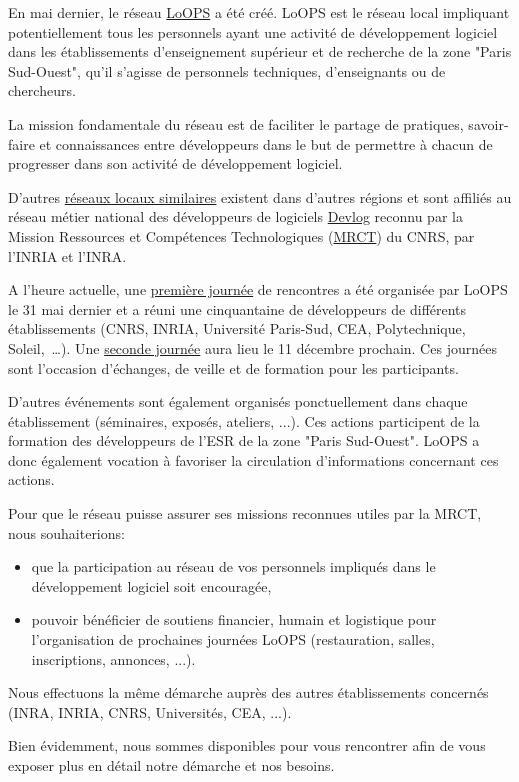 En mai dernier, le réseau \href{http://reseau-loops.github.com/}{LoOPS}
a été créé. LoOPS est le réseau local
impliquant potentiellement tous les personnels ayant une activité de
développement logiciel dans les établissements d'enseignement supérieur
et de recherche de la zone "Paris Sud-Ouest", qu'il s'agisse de personnels
techniques, d'enseignants ou de chercheurs.

La mission fondamentale du réseau est de faciliter le partage de pratiques,
savoir-faire et connaissances entre développeurs dans le but de permettre à
chacun de progresser dans son activité de développement logiciel.

D'autres \href{http://devlog.cnrs.fr/region}{réseaux locaux similaires} existent dans d'autres régions
et sont affiliés au réseau métier national des développeurs de logiciels
\href{http://devlog.cnrs.fr}{Devlog} reconnu par la Mission Ressources et Compétences Technologiques
(\href{http://www.mrct.cnrs.fr/}{MRCT}) du CNRS, par l'INRIA et l'INRA.

A l'heure actuelle, une
\href{http://reseau-loops.github.com/journee\_2012\_05\_31.html}{première journée}
de rencontres a été organisée par
LoOPS le 31 mai dernier et a réuni une cinquantaine de développeurs de
différents établissements (CNRS, INRIA, Université Paris-Sud, CEA,
Polytechnique, Soleil,~\dots).
Une \href{http://reseau-loops.github.com/journee\_2012\_12.html}{seconde journée} aura lieu le 11 décembre
prochain. Ces journées sont l'occasion d'échanges, de veille et de
formation pour les participants.

D'autres événements sont également organisés ponctuellement dans chaque
établissement (séminaires, exposés, ateliers, ...). Ces actions participent
de la formation des développeurs de l'ESR de la zone "Paris Sud-Ouest". LoOPS
a donc également vocation à favoriser la circulation d'informations concernant
ces actions.

Pour que le réseau puisse assurer ses missions reconnues utiles par la MRCT,
nous souhaiterions:
\begin{itemize}
\item que la participation au réseau de vos personnels impliqués dans le
  développement logiciel soit encouragée,
\item pouvoir bénéficier de soutiens financier, humain et logistique pour
  l'organisation de prochaines journées LoOPS (restauration, salles,
  inscriptions, annonces, ...).
\end{itemize}

Nous effectuons la même démarche auprès des autres établissements concernés
(INRA, INRIA, CNRS, Universités, CEA, ...).

Bien évidemment, nous sommes disponibles pour vous rencontrer afin de vous
exposer plus en détail notre démarche et nos besoins.